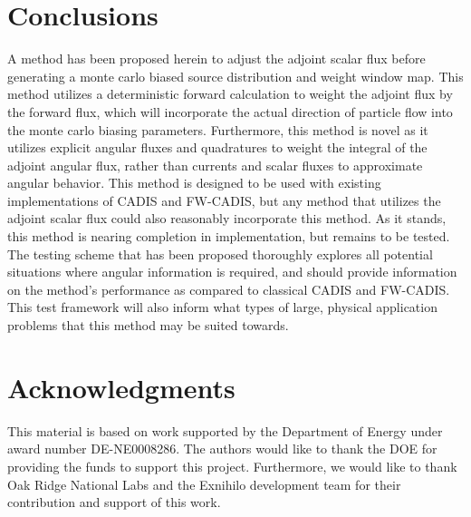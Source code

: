 \documentclass{mc2015}
\begin{document}
\section{Conclusions}
\label{sec:conclusions}

A method has been proposed herein to adjust the adjoint scalar flux before generating a monte carlo biased source distribution and weight window map. 
This method utilizes a deterministic forward calculation to weight the adjoint flux by the forward flux, which will incorporate the actual direction of particle flow into the monte carlo biasing parameters. 
Furthermore, this method is novel as it utilizes explicit angular fluxes and quadratures to weight the integral of the adjoint angular flux, rather than currents and scalar fluxes to approximate angular behavior. 
This method is designed to be used with existing implementations of CADIS and FW-CADIS, but any method that utilizes the adjoint scalar flux could also reasonably incorporate this method. 
As it stands, this method is nearing completion in implementation, but remains to be tested. 
The testing scheme that has been proposed thoroughly explores all potential situations where angular information is required, and should provide information on the method's performance as compared to classical CADIS and FW-CADIS. 
This test framework will also inform what types of large, physical application problems that this method may be suited towards. 


\section{Acknowledgments}

This material is based on work supported by the Department of Energy under award number DE-NE0008286. The authors would like to thank the DOE for providing the funds to support this project. Furthermore, we would like to thank Oak Ridge National Labs and the Exnihilo development team for their contribution and support of this work. 

\setlength{\baselineskip}{12pt}




\end{document}
